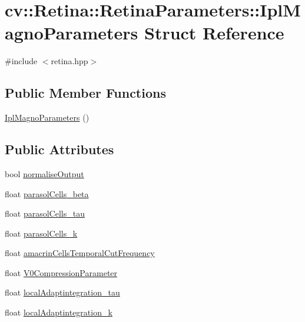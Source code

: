 \hypertarget{structcv_1_1Retina_1_1RetinaParameters_1_1IplMagnoParameters}{\section{cv\-:\-:Retina\-:\-:Retina\-Parameters\-:\-:Ipl\-Magno\-Parameters Struct Reference}
\label{structcv_1_1Retina_1_1RetinaParameters_1_1IplMagnoParameters}
}


{\ttfamily \#include $<$retina.\-hpp$>$}

\subsection*{Public Member Functions}
\begin{DoxyCompactItemize}
\item 
\hyperlink{structcv_1_1Retina_1_1RetinaParameters_1_1IplMagnoParameters_ac4e4fafcd1c5c3aae88620450d3f35d2}{Ipl\-Magno\-Parameters} ()
\end{DoxyCompactItemize}
\subsection*{Public Attributes}
\begin{DoxyCompactItemize}
\item 
bool \hyperlink{structcv_1_1Retina_1_1RetinaParameters_1_1IplMagnoParameters_a0463f35f6de36487907a9488bcd07a27}{normalise\-Output}
\item 
float \hyperlink{structcv_1_1Retina_1_1RetinaParameters_1_1IplMagnoParameters_a2a315d4e650b54397022b5711e1fea77}{parasol\-Cells\-\_\-beta}
\item 
float \hyperlink{structcv_1_1Retina_1_1RetinaParameters_1_1IplMagnoParameters_aa1cff23a59e2f8bc95dd9bb24e19a23e}{parasol\-Cells\-\_\-tau}
\item 
float \hyperlink{structcv_1_1Retina_1_1RetinaParameters_1_1IplMagnoParameters_a6b310bb2d09ec2fb075b642eed8c40f5}{parasol\-Cells\-\_\-k}
\item 
float \hyperlink{structcv_1_1Retina_1_1RetinaParameters_1_1IplMagnoParameters_ada6c705bb77ca85680bb7d69e92b98c7}{amacrin\-Cells\-Temporal\-Cut\-Frequency}
\item 
float \hyperlink{structcv_1_1Retina_1_1RetinaParameters_1_1IplMagnoParameters_a868952919c5b08aad76c1da706888b7d}{V0\-Compression\-Parameter}
\item 
float \hyperlink{structcv_1_1Retina_1_1RetinaParameters_1_1IplMagnoParameters_a045b3534058903b4a74ccd3ef544bcee}{local\-Adaptintegration\-\_\-tau}
\item 
float \hyperlink{structcv_1_1Retina_1_1RetinaParameters_1_1IplMagnoParameters_a412d06f40564a7f6070848b7805b3cfa}{local\-Adaptintegration\-\_\-k}
\end{DoxyCompactItemize}


